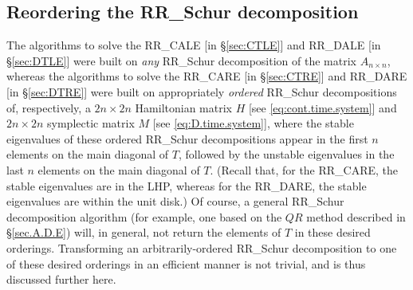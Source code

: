 \enlargethispage{7pt}
\subsection{Reordering the RR_Schur decomposition}\label{sec:ReorderedRR_Schur}

The algorithms to solve the RR_CALE [in \S \ref{sec:CTLE}] and RR_DALE [in \S \ref{sec:DTLE}] were built on {\it any} RR_Schur decomposition of
the matrix $A_{n\times n}$, whereas the algorithms to solve the RR_CARE [in \S \ref{sec:CTRE}] and RR_DARE [in \S \ref{sec:DTRE}] were built on appropriately {\it ordered} RR_Schur
decompositions of, respectively, a ${2n\times 2n}$ Hamiltonian matrix $H$ [see \eqref{eq:cont.time.system}] and ${2n\times 2n}$ symplectic matrix $M$ [see \eqref{eq:D.time.system}],
where the stable eigenvalues of these ordered RR_Schur decompositions appear in the first $n$ elements on the main diagonal of $T$, followed by the unstable eigenvalues in the last $n$
elements on the main diagonal of $T$.  (Recall that, for the RR_CARE, the stable eigenvalues are in the LHP, whereas for the RR_DARE, the stable eigenvalues are within the unit disk.)
Of course, a general RR_Schur decomposition algorithm (for example, one based on the $QR$ method described in \S \ref{sec.A.D.E})
will, in general, not return the elements of $T$ in these desired orderings.  Transforming an arbitrarily-ordered RR_Schur decomposition
to one of these desired orderings in an efficient manner is not trivial, and is thus discussed further here.

